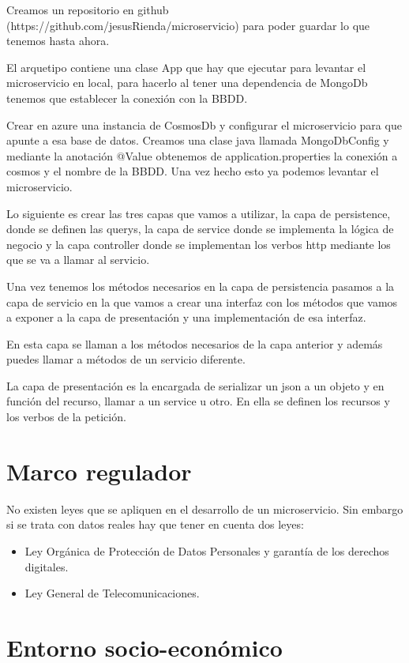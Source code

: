 \documentclass[12pt]{report} %
\begin{document}
	Creamos un repositorio en github (https://github.com/jesusRienda/microservicio) para poder guardar lo que tenemos hasta ahora.
	
	El arquetipo contiene una clase App que hay que ejecutar para levantar el microservicio en local, para hacerlo al tener una dependencia de MongoDb tenemos que establecer la conexión con la BBDD.
	
	Crear en azure una instancia de CosmosDb y configurar el microservicio para que apunte a esa base de datos. Creamos una clase java llamada MongoDbConfig y mediante la anotación @Value obtenemos de application.properties la conexión a cosmos y el nombre de la BBDD. Una vez hecho esto ya podemos levantar el microservicio.
	
	Lo siguiente es crear las tres capas que vamos a utilizar, la capa de persistence, donde se definen las querys, la capa de service donde se implementa la lógica de negocio y la capa controller donde se implementan los verbos http mediante los que se va a llamar al servicio.
	
	Una vez tenemos los métodos necesarios en la capa de persistencia pasamos a la capa de servicio en la que vamos a crear una interfaz con los métodos que vamos a exponer a la capa de presentación y una implementación de esa interfaz. 
	
	En esta capa se llaman a los métodos necesarios de la capa anterior y además puedes llamar a métodos de un servicio diferente.
	
	La capa de presentación es la encargada de serializar un json a un objeto y en función del recurso, llamar a un service u otro. En ella se definen los recursos y los verbos de la petición.
	\section{Marco regulador}
	
	No existen leyes que se apliquen en el desarrollo de un microservicio. Sin embargo si se trata con datos reales hay que tener en cuenta dos leyes:
	\begin{itemize}
		\item Ley Orgánica de Protección de Datos Personales y garantía de los derechos digitales.
		\item Ley General de Telecomunicaciones.
	\end{itemize}
	
	
	\section{Entorno socio-económico}	
	
\end{document}
